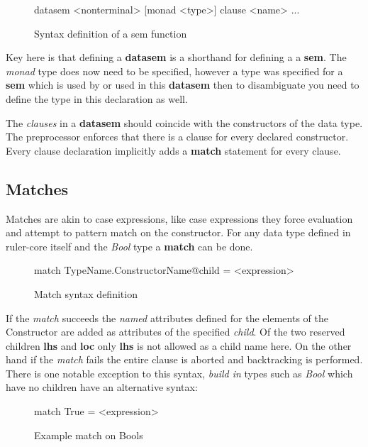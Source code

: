 \begin{figure}[!h]
\begin{code}
datasem <nonterminal> [monad <type>]
    {clause <name>
        ...
    }
\end{code}
\caption{Syntax definition of a sem function}
\label{datasem:syntax}
\end{figure}

Key here is that defining a \textbf{datasem} is a shorthand for defining a a \textbf{sem}. The \emph{monad} type does now need to be specified, however a type was specified for a \textbf{sem} which is used by or used in this \textbf{datasem} then to disambiguate you need to define the type in this declaration as well.

The \emph{clauses} in a \textbf{datasem} should coincide with the constructors of the data type. The preprocessor enforces that there is a clause for every declared constructor. Every clause declaration implicitly adds a \textbf{match} statement for every clause.

\subsection{Matches}
Matches are akin to case expressions, like case expressions they force evaluation and attempt to pattern match on the constructor. For any data type defined in ruler-core itself and the \emph{Bool} type a \textbf{match} can be done.

\begin{figure}[h!]
\begin{code}
match TypeName.ConstructorName@child  = <expression>
\end{code}
\caption{Match syntax definition}
\label{match:syntax}
\end{figure}

If the \emph{match} succeeds the \emph{named} attributes defined for the elements of the Constructor are added as attributes of the specified \emph{child}. Of the two reserved children \textbf{lhs} and \textbf{loc} only \textbf{lhs} is not allowed as a child name here. On the other hand if the \emph{match} fails the entire clause is aborted and backtracking is performed.
There is one notable exception to this syntax, \emph{build in} types such as \emph{Bool} which have no children have an alternative syntax:

\begin{figure}[h!]
\begin{code}
match True = <expression>
\end{code}
\caption{Example match on Bools}
\label{match:bool}
\end{figure}

